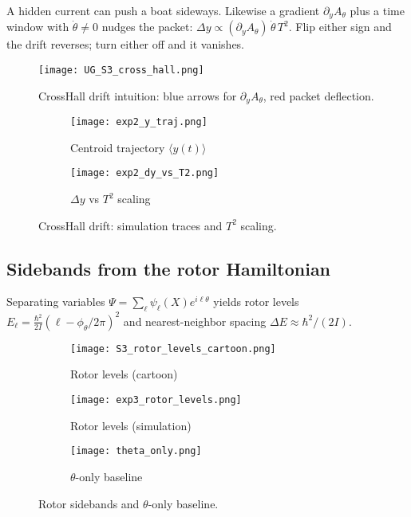 \begin{idea}
A hidden current can push a boat sideways. Likewise a gradient $\partial_y A_\theta$ plus a time window with $\dot\theta\neq 0$ nudges the packet: $\Delta y\propto(\partial_y A_\theta)\,\dot\theta\,T^2$. Flip either sign and the drift reverses; turn either off and it vanishes.
\end{idea}

\begin{figure}[htbp]
  \centering
  \texttt{[image: UG\_S3\_cross\_hall.png]}
  \caption{Cross\textendash Hall drift intuition: blue arrows for $\partial_yA_\theta$, red packet deflection.}
  \label{fig:cross-hall-cartoon2}
\end{figure}

\begin{figure}[htbp]
  \centering
  \begin{subfigure}[b]{0.48\linewidth}
    \centering
    \texttt{[image: exp2\_y\_traj.png]}
    \caption{Centroid trajectory $\langle y(t)\rangle$}
    \label{fig:cross-hall-traj}
  \end{subfigure}\hfill
  \begin{subfigure}[b]{0.48\linewidth}
    \centering
    \texttt{[image: exp2\_dy\_vs\_T2.png]}
    \caption{$\Delta y$ vs $T^2$ scaling}
    \label{fig:cross-hall-scaling}
  \end{subfigure}
  \caption{Cross\textendash Hall drift: simulation traces and $T^2$ scaling.}
  \label{fig:cross-hall}
\end{figure}


\subsection{Sidebands from the rotor Hamiltonian}\label{sec:sidebands}
Separating variables $\Psi=\sum_{\ell}\psi_\ell(X)e^{i\ell\theta}$ yields rotor levels $E_\ell=\frac{\hbar^2}{2I}(\ell-\phi_\theta/2\pi)^2$ and nearest-neighbor spacing $\Delta E\approx\hbar^2/(2I)$.

\begin{figure}[htbp]
  \centering
  \begin{subfigure}[b]{0.48\linewidth}
    \centering
  \texttt{[image: S3\_rotor\_levels\_cartoon.png]}
    \caption{Rotor levels (cartoon)}
    \label{fig:rotor-cartoon}
  \end{subfigure}\hfill
  \begin{subfigure}[b]{0.48\linewidth}
    \centering
    \texttt{[image: exp3\_rotor\_levels.png]}
    \caption{Rotor levels (simulation)}
    \label{fig:rotor-sim}
  \end{subfigure}
  \begin{subfigure}[b]{0.48\linewidth}
    \centering
  \texttt{[image: theta\_only.png]}
    \caption{$\theta$-only baseline}
    \label{fig:theta-only}
  \end{subfigure}
  \caption{Rotor sidebands and $\theta$-only baseline.}
  \label{fig:rotor}
\end{figure}

